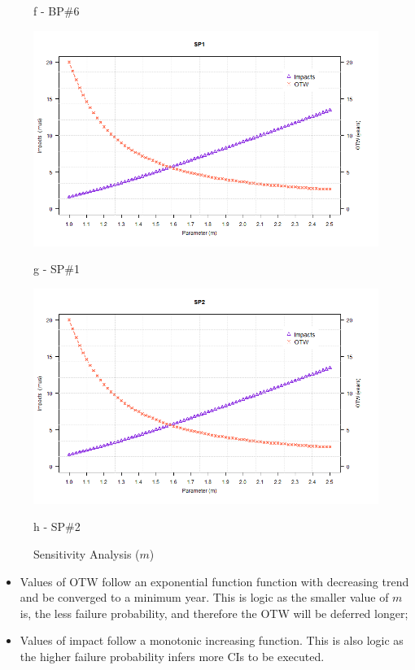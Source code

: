 \begin{figure}[!htb]
\begin{minipage}[b]{0.5\linewidth}
		\caption*{f - BP\#6}
	\end{minipage}
	\hspace{0.05cm}
	\begin{minipage}[b]{0.5\linewidth}
		\centering
		\includegraphics[width=\textwidth]{figures/ch05_fig_sam_pump7}
		\caption*{g -  SP\#1}
	\end{minipage}
	\hspace{0.05cm}
	\begin{minipage}[b]{0.5\linewidth}
		\centering
		\includegraphics[width=\textwidth]{figures/ch05_fig_sam_pump8}
		\caption*{h - SP\#2}
	\end{minipage}
	\caption{Sensitivity Analysis ($m$)}
	\label{ch05_fig_sa_m}
\end{figure}

\begin{itemize}
	\item Values of OTW follow an exponential function function with decreasing trend and be converged to a minimum year. This is logic as the smaller value of $m$ is, the less failure probability, and therefore the OTW will be deferred longer;
	\item Values of impact follow a monotonic increasing function. This is also logic as the higher failure probability infers more CIs to be executed. 
\end{itemize}

